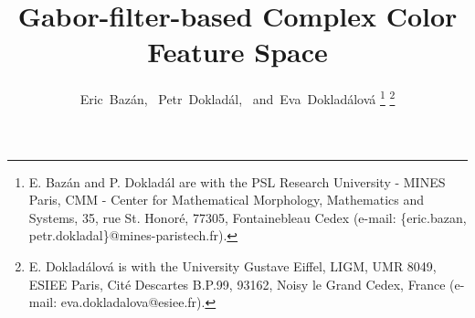 \documentclass[journal]{IEEEtran}
\begin{document}
\showthe\textwidth  %
\title{Gabor-filter-based Complex Color Feature Space}
%
%
%

\author{Eric~Bazán,~%
        Petr~Dokladál,~%
        and~Eva~Dokladálová%
\thanks{E. Bazán and P. Dokladál are with the PSL Research University - MINES Paris, CMM - Center for Mathematical Morphology, Mathematics and Systems, 35, rue St. Honor\'{e}, 77305, Fontainebleau Cedex (e-mail: \{eric.bazan, petr.dokladal\}@mines-paristech.fr).}%
\thanks{E. Dokladálová is with the University Gustave Eiffel, LIGM, UMR 8049, ESIEE Paris, Cité Descartes B.P.99, 93162, Noisy le Grand Cedex, France (e-mail: eva.dokladalova@esiee.fr).}}%

% 
%
\end{document}
